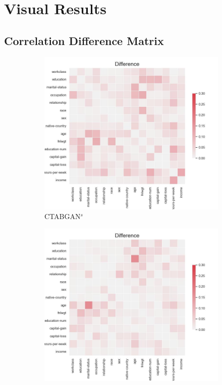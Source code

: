\section{Visual Results}
\label{A:Visual_results}

\subsection[]{Correlation Difference Matrix}
\label{A:corr_matrix}

\begin{figure}[h]
	\centering
	\begin{subfigure}{0.3\textwidth}
		\includegraphics[width=\textwidth]{images/correlation_difference/ctabgan_simTune.jpg}
		\caption{CTABGAN$^s$}
	\end{subfigure}
	\begin{subfigure}{0.3\textwidth}
		\includegraphics[width=\textwidth]{images/correlation_difference/ctabgan+_simTune.jpg}

\end{subfigure}
\end{figure}
